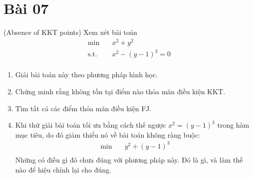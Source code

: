 \section{Bài 07}

(Absence of KKT points) Xem xét bài toán
\begin{equation}
    \label{problem:07}
    \begin{aligned}
        \min \quad & x^2 + y^2\\
        \textrm{s.t.} \quad & x^2 - (y - 1)^3 = 0\\
    \end{aligned}
\end{equation}

\begin{enumerate}[label=(\alph*)]
    \item Giải bài toán này theo phương pháp hình học.
    \item Chứng minh rằng không tồn tại điểm nào thỏa mãn điều kiện KKT.
    \item Tìm tất cả các điểm thỏa mãn điều kiện FJ.
    \item Khi thử giải bài toán tối ưu bằng cách thế ngược $x^2 = (y - 1)^3$ trong hàm mục tiêu, do đó giảm thiểu nó về bài toán không ràng buộc:
    \begin{equation}
        \begin{aligned}
            \min \quad & y^2 + (y-1)^3\\
        \end{aligned}
    \end{equation}
    Những có điều gì đó chưa đúng với phương pháp này. Đó là gì, và làm thế nào để hiệu chỉnh lại cho đúng.
\end{enumerate}

